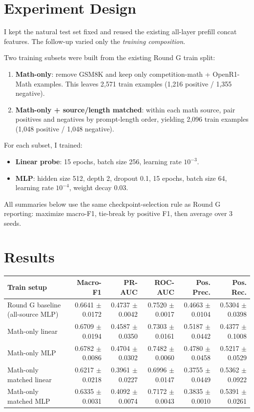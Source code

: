 \documentclass[11pt]{article}
\begin{document}
\section*{Experiment Design}
I kept the natural test set fixed and reused the existing all-layer prefill concat features. The follow-up varied only the \emph{training composition}.

Two training subsets were built from the existing Round G train split:
\begin{enumerate}
  \item \textbf{Math-only}: remove GSM8K and keep only competition-math + OpenR1-Math examples. This leaves 2,571 train examples (1,216 positive / 1,355 negative).
  \item \textbf{Math-only + source/length matched}: within each math source, pair positives and negatives by prompt-length order, yielding 2,096 train examples (1,048 positive / 1,048 negative).
\end{enumerate}

For each subset, I trained:
\begin{itemize}
  \item \textbf{Linear probe}: 15 epochs, batch size 256, learning rate $10^{-3}$.
  \item \textbf{MLP}: hidden size 512, depth 2, dropout 0.1, 15 epochs, batch size 64, learning rate $10^{-4}$, weight decay 0.03.
\end{itemize}
All summaries below use the same checkpoint-selection rule as Round G reporting: maximize macro-F1, tie-break by positive F1, then average over 3 seeds.

\section*{Results}
\begin{center}
\small
\setlength{\tabcolsep}{4pt}
\begin{tabular}{@{}p{3.2cm}rrrrr@{}}
\toprule
Train setup & Macro-F1 & PR-AUC & ROC-AUC & Pos. Prec. & Pos. Rec. \\
\midrule
Round G baseline (all-source MLP) & 0.6641 $\pm$ 0.0172 & 0.4737 $\pm$ 0.0042 & 0.7520 $\pm$ 0.0017 & 0.4663 $\pm$ 0.0104 & 0.5304 $\pm$ 0.0398 \\
Math-only linear & 0.6709 $\pm$ 0.0194 & 0.4587 $\pm$ 0.0350 & 0.7303 $\pm$ 0.0161 & 0.5187 $\pm$ 0.0442 & 0.4377 $\pm$ 0.1008 \\
Math-only MLP & 0.6782 $\pm$ 0.0086 & 0.4704 $\pm$ 0.0302 & 0.7482 $\pm$ 0.0060 & 0.4780 $\pm$ 0.0458 & 0.5217 $\pm$ 0.0529 \\
Math-only matched linear & 0.6217 $\pm$ 0.0218 & 0.3961 $\pm$ 0.0227 & 0.6996 $\pm$ 0.0147 & 0.3755 $\pm$ 0.0449 & 0.5362 $\pm$ 0.0922 \\
Math-only matched MLP & 0.6335 $\pm$ 0.0031 & 0.4092 $\pm$ 0.0074 & 0.7172 $\pm$ 0.0043 & 0.3835 $\pm$ 0.0010 & 0.5391 $\pm$ 0.0261 \\
\bottomrule
\end{tabular}
\end{center}
\end{document}
